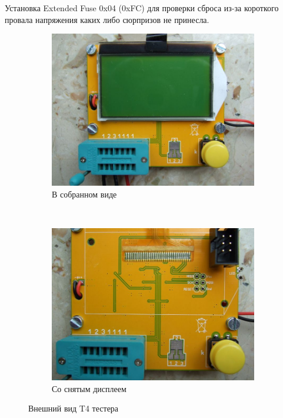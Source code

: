 Установка Extended Fuse 0x04 (0xFC) для проверки сброса из-за короткого провала напряжения 
каких либо сюрпризов не принесла.
\begin{figure}[H]
  \begin{subfigure}[b]{.5\textwidth}
    \centering
    \includegraphics[width=1.\textwidth]{../PNG/T4_front.JPG}
    \caption{В собранном виде}
  \end{subfigure}
  ~
  \begin{subfigure}[b]{.5\textwidth}
    \centering
    \includegraphics[width=1.\textwidth]{../PNG/T4_front_noLCD.JPG}
    \caption{Со снятым дисплеем}
  \end{subfigure}
  \caption{Внешний вид T4 тестера}
  \label{fig:T4_front}
\end{figure}
